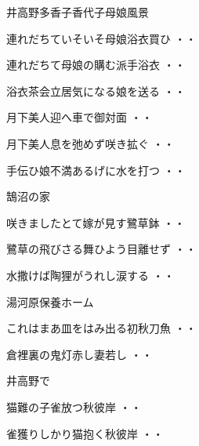\vspace{0.6cm}
井高野多香子香代子母娘風景
\begin{shiika}連れだちていそいそ母娘浴衣買ひ
\hfill{・・}\end{shiika}
\vspace{0.6cm}
\begin{shiika}連れだちて母娘の購む派手浴衣
\hfill{・・}\end{shiika}
\vspace{0.6cm}
\begin{shiika}浴衣茶会立居気になる娘を送る
\hfill{・・}\end{shiika}
\begin{shiika}月下美人迎へ車で御対面
\hfill{・・}\end{shiika}
\begin{shiika}月下美人息を弛めず咲き拡ぐ
\hfill{・・}\end{shiika}
\begin{shiika}手伝ひ娘不満あるげに水を打つ
\hfill{・・}\end{shiika}
\vspace{0.6cm}
鵠沼の家
\begin{shiika}咲きましたとて嫁が見す鷺草鉢
\hfill{・・}\end{shiika}
\begin{shiika}鷺草の飛びさる舞ひよう目離せず
\hfill{・・}\end{shiika}
\begin{shiika}水撒けば陶狸がうれし涙する
\hfill{・・}\end{shiika}
\vspace{0.6cm}
湯河原保養ホーム
\begin{shiika}これはまあ皿をはみ出る初秋刀魚
\hfill{・・}\end{shiika}
\begin{shiika}倉裡裏の鬼灯赤し妻若し
\hfill{・・}\end{shiika}
\vspace{0.6cm}
井高野で
\begin{shiika}猫難の子雀放つ秋彼岸
\hfill{・・}\end{shiika}
\begin{shiika}雀獲りしかり猫抱く秋彼岸
\hfill{・・}\end{shiika}
